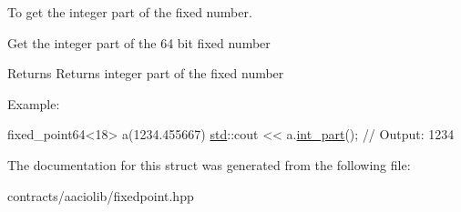 To get the integer part of the fixed number. 

Get the integer part of the 64 bit fixed number \begin{DoxyReturn}{Returns}
Returns integer part of the fixed number
\end{DoxyReturn}
Example\+: 
\begin{DoxyCode}
fixed\_point64<18> a(1234.455667)
\mbox{\hyperlink{namespacestd}{std}}::cout << a.\mbox{\hyperlink{structaacio_1_1fixed__point64_a674a0fb3a852c50dedfb2c167113447d}{int\_part}}(); \textcolor{comment}{// Output: 1234}
\end{DoxyCode}
 

The documentation for this struct was generated from the following file\+:\begin{DoxyCompactItemize}
\item 
contracts/aaciolib/fixedpoint.\+hpp\end{DoxyCompactItemize}
